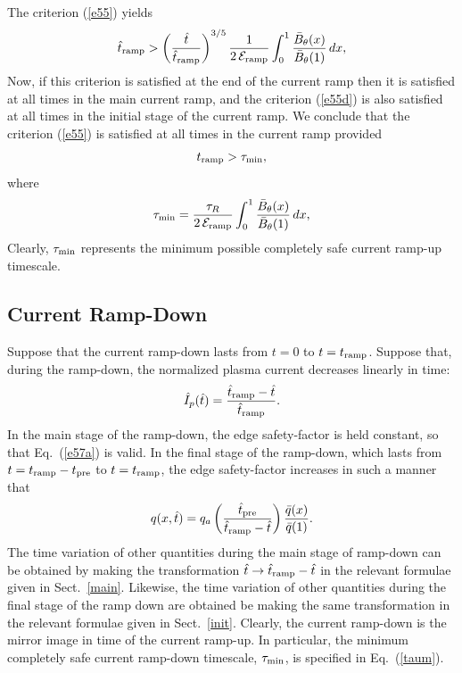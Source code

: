 \documentclass[12pt,prb,aps]{revtex4-1}
\begin{document}
The criterion (\ref{e55}) yields
\begin{equation}
\hat{t}_{\rm ramp} > \left(\frac{\hat{t}}{\hat{t}_{\rm ramp}}\right)^{3/5}\frac{1}{2\,{\cal E}_{\rm ramp}}\int_0^1\frac{\bar{B}_{\theta}(x)}{\bar{B}_\theta(1)}\,dx,
\end{equation}
Now, if this criterion is satisfied at the end of the current ramp then it is satisfied at all times in the main current ramp, and the criterion (\ref{e55d})
is also satisfied at all times in the initial stage of the current ramp. 
We conclude that the criterion (\ref{e55}) is satisfied at all times in the current ramp provided 
\begin{equation}
t_{\rm ramp} > \tau_{\rm min},
\end{equation}
where \begin{equation}\label{taum}
\tau_{\rm min}= \frac{\tau_R}{2\,{\cal E}_{\rm ramp}}\int_0^1\frac{\bar{B}_{\theta}(x)}{\bar{B}_\theta(1)}\,dx,
\end{equation}
Clearly, $\tau_{\rm min}$ represents the minimum possible completely safe current ramp-up timescale. 

\subsection{Current Ramp-Down}
Suppose that the current ramp-down lasts from $t=0$ to $t=t_{\rm ramp}$. Suppose that, during the ramp-down, 
the normalized plasma current decreases linearly in time:
\begin{equation}
\hat{I}_p(\hat{t}) = \frac{\hat{t}_{\rm ramp}-\hat{t}}{\hat{t}_{\rm ramp}}.
\end{equation}
In the main stage of the ramp-down, the edge safety-factor is held constant, so that Eq.~(\ref{e57a}) is valid.
In the final stage of the ramp-down, which lasts from $t=t_{\rm ramp}-t_{\rm pre}$ to $t=t_{\rm ramp}$,
the edge safety-factor increases in such a manner that 
\begin{equation}
q(x,\hat{t}) = q_a\left(\frac{\hat{t}_{\rm pre}}{\hat{t}_{\rm ramp}-\hat{t}}\right)\frac{\bar{q}(x)}{\bar{q}(1)}.
\end{equation}
The time variation of other quantities during the main stage of ramp-down can be obtained by making the transformation
$\hat{t}\rightarrow \hat{t}_{\rm ramp} - \hat{t}$ in the relevant formulae  given in Sect.~\ref{main}. Likewise,
the time variation of other quantities during the final stage of the ramp down are obtained be making the
same transformation in the relevant formulae given in Sect.~\ref{init}. Clearly, the current ramp-down is the mirror image in time of the current ramp-up.
In particular, the minimum completely safe current
ramp-down timescale, $\tau_{\rm min}$, is specified in Eq.~(\ref{taum}). 
\end{document}
